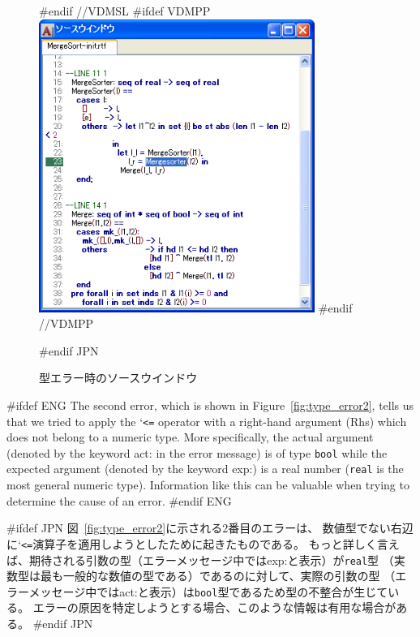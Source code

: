\documentclass[\pformat,12pt]{article}
\newcommand{\Lit}[1]{`#1\Quote}
\newcommand{\Sig}[1]{\Lit{{\tt #1}}}
\begin{document}
\begin{figure}[tbh]
\begin{center}
#endif //VDMSL
#ifdef VDMPP
\includegraphics[width=9cm]{sourceWindow-type-pp.png}
#endif //VDMPP
\caption{型エラー時のソースウインドウ}
#endif JPN
\label{fig:source-type}
\end{center}
\end{figure}

#ifdef ENG
The second error, which is shown in Figure~\ref{fig:type_error2},
tells us that we tried to apply the \Sig{<=} operator with a
right-hand argument (Rhs) which does not belong to a numeric
type. More specifically, the actual argument (denoted by the keyword
{\sf act:} in the error message) is of type {\tt bool} while the 
expected argument (denoted by the keyword {\sf exp:}) is a real number
({\tt real} is the most general numeric type). Information like this
can be valuable when trying to determine the cause of an error.
#endif ENG

#ifdef JPN
図~\ref{fig:type_error2}に示される2番目のエラーは、
数値型でない右辺に\Sig{<=}演算子を適用しようとしたために起きたものである。
もっと詳しく言えば、期待される引数の型（エラーメッセージ中では{\sf exp:}と表示）が{\tt real}型
（実数型は最も一般的な数値の型である）であるのに対して、実際の引数の型
（エラーメッセージ中では{\sf act:}と表示）は{\tt bool}型であるため型の不整合が生じている。
エラーの原因を特定しようとする場合、このような情報は有用な場合がある。
#endif JPN
\end{document}
